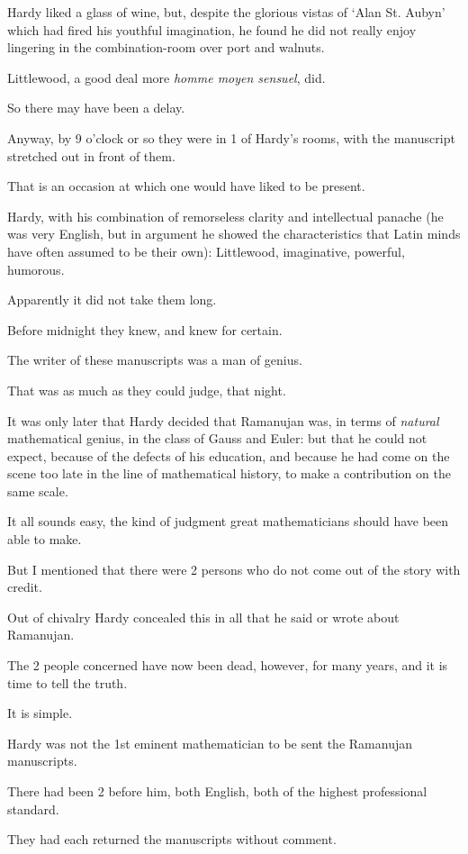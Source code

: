 \documentclass{article}
\numberwithin{equation}{section}
\begin{document}
Hardy liked a glass of wine, but, despite the glorious vistas of `Alan St. Aubyn' which had fired his youthful imagination, he found he did not really enjoy lingering in the combination-room over port and walnuts.

Littlewood, a good deal more \textit{homme moyen sensuel}, did.

So there may have been a delay.

Anyway, by 9 o'clock or so they were in 1 of Hardy's rooms, with the manuscript stretched out in front of them.

%
That is an occasion at which one would have liked to be present.

Hardy, with his combination of remorseless clarity and intellectual panache (he was very English, but in argument he showed the characteristics that Latin minds have often assumed to be their own): Littlewood, imaginative, powerful, humorous.

Apparently it did not take them long.


Before midnight they knew, and knew for certain.

The writer of these manuscripts was a man of genius.

That was as much as they could judge, that night.

It was only later that Hardy decided that Ramanujan was, in terms of \textit{natural} mathematical genius, in the class of Gauss and Euler: but that he could not expect, because of the defects of his education, and because he had come on the scene too late in the line of mathematical history, to make a contribution on the same scale.

%
It all sounds easy, the kind of judgment great mathematicians should have been able to make.

But I mentioned that there were 2 persons who do not come out of the story with credit.

Out of chivalry Hardy concealed this in all that he said or wrote about Ramanujan.

The 2 people concerned have now been dead, however, for many years, and it is time to tell the truth.

It is simple.

Hardy was not the 1st eminent mathematician to be sent the Ramanujan manuscripts.

There had been 2 before him, both English, both of the highest professional standard.

They had each returned the manuscripts without comment.
\end{document}
